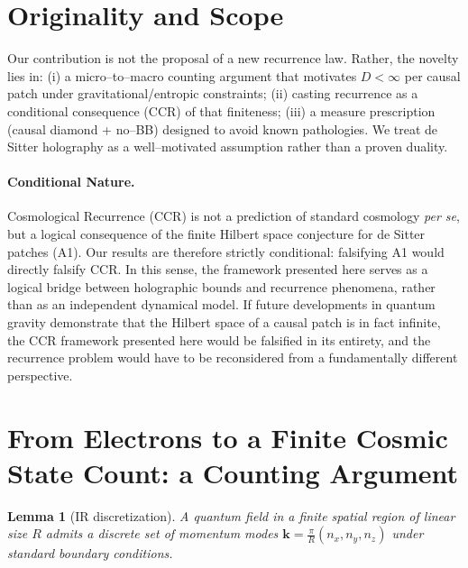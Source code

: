 \documentclass[12pt]{article}
\newtheorem{lemma}{Lemma}
\theoremstyle{remark}
\begin{document}
\section*{Originality and Scope}

Our contribution is not the proposal of a new recurrence law. Rather, the novelty lies in:
(i) a micro–to–macro counting argument that motivates $D < \infty$ per causal patch under
gravitational/entropic constraints;
(ii) casting recurrence as a conditional consequence (CCR) of that finiteness;
(iii) a measure prescription (causal diamond + no–BB) designed to avoid known pathologies.
We treat de Sitter holography as a well–motivated assumption rather than a proven duality.

\begin{center}
\end{center}


\paragraph{Conditional Nature.} 
Cosmological Recurrence (CCR) is not a prediction of standard cosmology \emph{per se}, but a logical consequence of the finite Hilbert space conjecture for de Sitter patches (A1). Our results are therefore strictly conditional: falsifying A1 would directly falsify CCR. In this sense, the framework presented here serves as a logical bridge between holographic bounds and recurrence phenomena, rather than as an independent dynamical model. If future developments in quantum gravity demonstrate that the Hilbert space of a causal patch is in fact infinite, the CCR framework presented here would be falsified in its entirety, and the recurrence problem would have to be reconsidered from a fundamentally different perspective.

\section{From Electrons to a Finite Cosmic State Count: a Counting Argument}
\begin{lemma}[IR discretization]\label{lem:IR}
A quantum field in a finite spatial region of linear size $R$ admits a discrete set of momentum modes
$\mathbf{k}=\frac{\pi}{R}(n_x,n_y,n_z)$ under standard boundary conditions.
\end{lemma}
\end{document}
